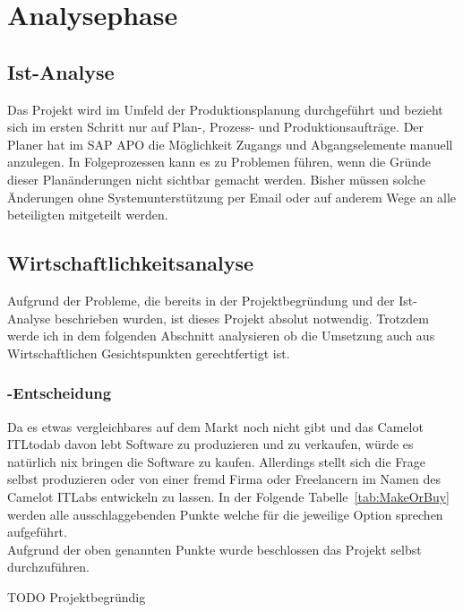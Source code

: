\section{Analysephase} 
\label{sec:Analysephase}

\subsection{Ist-Analyse} 
\label{sec:IstAnalyse}
Das Projekt wird im Umfeld der Produktionsplanung durchgeführt und bezieht sich im ersten Schritt nur auf Plan-, Prozess- und Produktionsaufträge. Der Planer hat im SAP \ac{APO} die	Möglichkeit Zugangs und Abgangselemente manuell anzulegen. In Folgeprozessen kann es zu Problemen führen, wenn die Gründe dieser Planänderungen nicht sichtbar gemacht werden. Bisher müssen solche Änderungen ohne Systemunterstützung per Email oder auf anderem Wege an alle beteiligten mitgeteilt werden.

\subsection{Wirtschaftlichkeitsanalyse}
\label{sec:Wirtschaftlichkeitsanalyse}
Aufgrund der Probleme, die bereits in der Projektbegründung und der Ist-Analyse beschrieben wurden, ist dieses Projekt absolut notwendig. Trotzdem werde ich in dem folgenden Abschnitt analysieren ob die Umsetzung auch aus Wirtschaftlichen Gesichtspunkten gerechtfertigt ist.

\subsubsection{-Entscheidung}
\label{sec:MakeOrBuyEntscheidung}

Da es etwas vergleichbares auf dem Markt noch nicht gibt und das Camelot ITLtodab davon lebt Software zu produzieren und zu verkaufen, würde es natürlich nix bringen die Software zu kaufen. Allerdings stellt sich die Frage selbst produzieren oder von einer fremd Firma oder Freelancern im Namen des Camelot ITLabs entwickeln zu lassen. In der Folgende Tabelle~\ref{tab:MakeOrBuy} werden alle ausschlaggebenden Punkte welche für die jeweilige Option sprechen aufgeführt.
\\
Aufgrund der oben genannten Punkte wurde beschlossen das Projekt selbst durchzuführen.

TODO Projektbegründig

